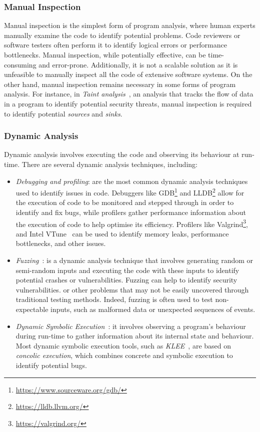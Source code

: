 \subsubsection{Manual Inspection}
Manual inspection is the simplest form of program analysis, where human experts
manually examine the code to identify potential problems. Code reviewers or software 
testers often perform it to identify logical errors or performance bottlenecks. 
Manual inspection, while potentially effective, can
be time-consuming and error-prone. Additionally, it is not a scalable solution as 
it is unfeasible to manually inspect all the code of extensive software systems. 
On the other hand, manual inspection remains necessary in some forms of program analysis. For instance,
in \emph{Taint analysis}~\cite{arzt2014flowdroid}, an analysis that tracks the flow of data in a program
to identify potential security threats, manual inspection is required to identify
potential \emph{sources} and \emph{sinks}.

\subsubsection{Dynamic Analysis}
Dynamic analysis involves executing the code and observing its behaviour at run-time.
There are several dynamic analysis techniques, including:
\begin{itemize}
  \item \emph{Debugging and profiling}: are the most common dynamic analysis techniques used to identify issues in code.
  Debuggers like GDB\footnote{\url{https://www.sourceware.org/gdb/}} and LLDB\footnote{\url{https://lldb.llvm.org/}} allow for the execution of code to be
  monitored and stepped through in order to identify and fix bugs,
  while profilers gather performance information about the execution of code to help optimise its efficiency.
  Profilers like Valgrind\footnote{\url{https://valgrind.org/}}, and Intel VTune~\cite{reinders2005vtune} can be used to identify memory leaks,
  performance bottlenecks, and other issues.
  \item \emph{Fuzzing}~\cite{li2018fuzzing}: is a dynamic analysis technique that 
  involves generating random or semi-random inputs and executing the code with these 
  inputs to identify potential crashes or vulnerabilities. Fuzzing can help to 
  identify security vulnerabilities.
  or other problems that may not be easily uncovered through traditional testing methods.
  Indeed, fuzzing is often used to test non-expectable inputs, such as malformed data
  or unexpected sequences of events.
  \item \emph{Dynamic Symbolic Execution}~\cite{Baldoni2018Survey}: it involves 
  observing a program's behaviour during run-time to gather information about its 
  internal state and behaviour.
  Most dynamic symbolic execution tools,
  such as \emph{KLEE}~\cite{cadar2008klee}, are based on \emph{concolic execution},
  which combines concrete and symbolic execution to identify potential bugs.
\end{itemize}

